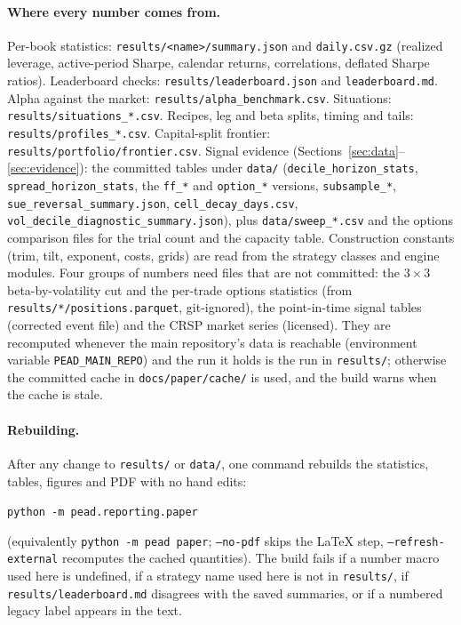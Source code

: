 \documentclass[11pt]{article}
\theoremstyle{definition}
\newcommand{\1}{\mathbf{1}}
\begin{document}
\paragraph{Where every number comes from.}\begin{sloppypar}
Per-book statistics: \texttt{results/<name>/summary.json} and \texttt{daily.csv.gz} (realized leverage, active-period Sharpe, calendar returns, correlations, deflated Sharpe ratios). Leaderboard checks: \texttt{results/leaderboard.json} and \texttt{leaderboard.md}.
Alpha against the market: \texttt{results/alpha\_benchmark.csv}. Situations: \texttt{results/situations\_*.csv}. Recipes, leg and beta splits, timing and tails: \texttt{results/profiles\_*.csv}. Capital-split frontier: \texttt{results/portfolio/frontier.csv}.
Signal evidence (Sections~\ref{sec:data}--\ref{sec:evidence}): the committed tables under \texttt{data/} (\texttt{decile\_horizon\_stats}, \texttt{spread\_horizon\_stats}, the \texttt{ff\_*} and \texttt{option\_*} versions, \texttt{subsample\_*}, \texttt{sue\_reversal\_summary.json}, \texttt{cell\_decay\_days.csv},
\texttt{vol\_decile\_diagnostic\_summary.json}), plus \texttt{data/sweep\_*.csv} and the options comparison files for the trial count and the capacity table. Construction constants (trim, tilt, exponent, costs, grids) are read from the strategy classes and engine modules.
Four groups of numbers need files that are not committed: the $3\times3$ beta-by-volatility cut and the per-trade options statistics (from \texttt{results/*/positions.parquet}, git-ignored), the point-in-time signal tables (corrected event file) and the CRSP market series (licensed). They are recomputed whenever the main repository's data is reachable (environment variable
\texttt{PEAD\_MAIN\_REPO}) and the run it holds is the run in \texttt{results/}; otherwise the committed cache in \texttt{docs/paper/cache/} is used, and the build warns when the cache is stale.

\end{sloppypar}
\paragraph{Rebuilding.} After any change to \texttt{results/} or \texttt{data/}, one command rebuilds the statistics, tables, figures and PDF with no hand edits:
\begin{center}\texttt{python -m pead.reporting.paper}\end{center}
(equivalently \texttt{python -m pead paper}; \texttt{--no-pdf} skips the LaTeX step, \texttt{--refresh-external} recomputes the cached quantities). The build fails if a number macro used here is undefined, if a strategy name used here is not in \texttt{results/}, if
\texttt{results/leaderboard.md} disagrees with the saved summaries, or if a numbered legacy label appears in the text.
\end{document}
